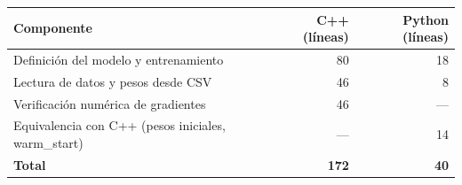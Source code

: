 \begin{tabular}{lrr}
\toprule
Componente & C++ (líneas) & Python (líneas) \\
\midrule
Definición del modelo y entrenamiento & 80 & 18 \\
Lectura de datos y pesos desde CSV & 46 & 8 \\
Verificación numérica de gradientes & 46 & --- \\
Equivalencia con C++ (pesos iniciales, warm\_start) & --- & 14 \\
\textbf{Total} & \textbf{172} & \textbf{40} \\
\bottomrule
\end{tabular}
